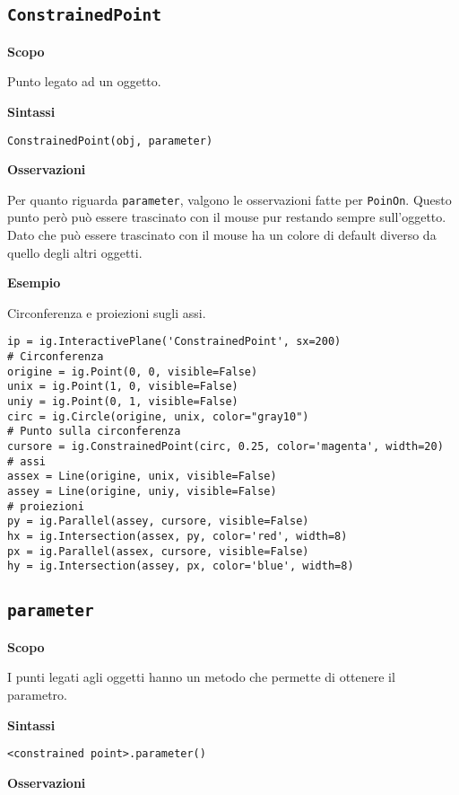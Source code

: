 \subsection{\texttt{ConstrainedPoint}}
\label{sub:geoint_constrainedpoint}
\textbf{Scopo}

Punto legato ad un oggetto.

\textbf{Sintassi}

\begin{lstlisting}
ConstrainedPoint(obj, parameter)
\end{lstlisting}

\textbf{Osservazioni}

Per quanto riguarda \texttt{parameter}, valgono le osservazioni fatte per
\texttt{PoinOn}.
Questo punto però può essere trascinato con il mouse pur restando sempre
sull'oggetto. Dato che può essere trascinato con il mouse
ha un colore di default diverso da quello degli altri oggetti.

\textbf{Esempio}

Circonferenza e proiezioni sugli assi.

\begin{lstlisting}
ip = ig.InteractivePlane('ConstrainedPoint', sx=200)
# Circonferenza
origine = ig.Point(0, 0, visible=False)
unix = ig.Point(1, 0, visible=False)
uniy = ig.Point(0, 1, visible=False)
circ = ig.Circle(origine, unix, color="gray10")
# Punto sulla circonferenza
cursore = ig.ConstrainedPoint(circ, 0.25, color='magenta', width=20)
# assi
assex = Line(origine, unix, visible=False)
assey = Line(origine, uniy, visible=False)
# proiezioni
py = ig.Parallel(assey, cursore, visible=False)
hx = ig.Intersection(assex, py, color='red', width=8)
px = ig.Parallel(assex, cursore, visible=False)
hy = ig.Intersection(assey, px, color='blue', width=8)
\end{lstlisting}


\subsection{\texttt{parameter}}
\label{sub:geoint_parameter}
\textbf{Scopo}

I punti legati agli oggetti hanno un metodo che permette di ottenere il
parametro.

\textbf{Sintassi}

\begin{lstlisting}
<constrained point>.parameter()
\end{lstlisting}

\textbf{Osservazioni}


